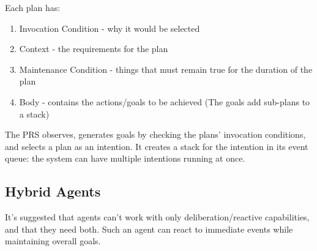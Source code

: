 Each plan has:
\begin{enumerate}
    \item Invocation Condition - why it would be selected
    \item Context - the requirements for the plan
    \item Maintenance Condition - things that must remain true for the duration of the plan
    \item Body - contains the actions/goals to be achieved (The goals add sub-plans to a stack)
\end{enumerate}

The PRS observes, generates goals by checking the plans' invocation conditions, and selects a plan as an intention. It creates a stack for the intention in its event queue: the system can have multiple intentions running at once.  

\subsection{Hybrid Agents}
It's suggested that agents can't work with only deliberation/reactive capabilities, and that they need both. Such an agent can react to immediate events while maintaining overall goals. 

